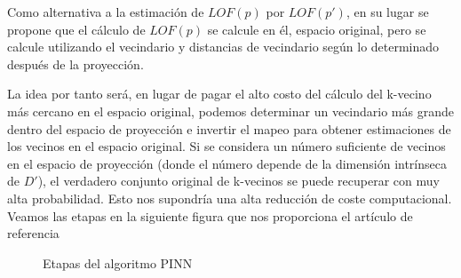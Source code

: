 Como alternativa a la estimación de $LOF(p)$ por $LOF(p')$, en su
lugar se propone que el cálculo de $LOF(p)$ se calcule en él, 
espacio original, pero se calcule utilizando el vecindario 
y distancias de vecindario según lo determinado después de la 
proyección.


La idea por tanto será, en lugar de pagar el alto costo del cálculo 
del k-vecino más cercano en el espacio original, podemos determinar 
un vecindario más grande dentro del espacio de proyección e 
invertir el mapeo para obtener estimaciones de los vecinos en el 
espacio original. Si se considera un número suficiente de vecinos 
en el espacio de proyección (donde el número depende de la dimensión 
intrínseca de $D'$), el verdadero conjunto original de k-vecinos se 
puede recuperar con muy alta probabilidad. Esto nos supondría una 
alta reducción de coste computacional. Veamos las etapas en la siguiente
figura que nos proporciona el artículo de referencia \cite{vriesFindingLocalAnomalies2010}


\begin{figure}[H]
    \caption{\label{fig:pinn} Etapas del algoritmo PINN}
\end{figure}

